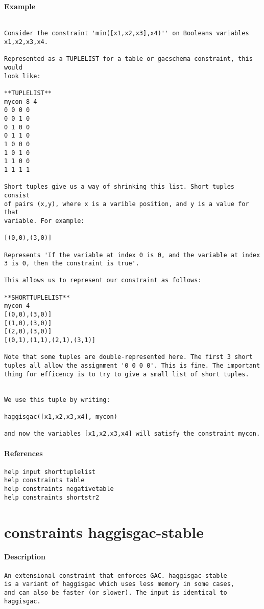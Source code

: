 \paragraph{Example}
{\footnotesize
\begin{verbatim}

Consider the constraint 'min([x1,x2,x3],x4)'' on Booleans variables
x1,x2,x3,x4.

Represented as a TUPLELIST for a table or gacschema constraint, this would
look like:

**TUPLELIST**
mycon 8 4
0 0 0 0
0 0 1 0
0 1 0 0
0 1 1 0
1 0 0 0
1 0 1 0
1 1 0 0
1 1 1 1

Short tuples give us a way of shrinking this list. Short tuples consist
of pairs (x,y), where x is a varible position, and y is a value for that
variable. For example:

[(0,0),(3,0)]

Represents 'If the variable at index 0 is 0, and the variable at index
3 is 0, then the constraint is true'.

This allows us to represent our constraint as follows:

**SHORTTUPLELIST**
mycon 4
[(0,0),(3,0)]
[(1,0),(3,0)]
[(2,0),(3,0)]
[(0,1),(1,1),(2,1),(3,1)]

Note that some tuples are double-represented here. The first 3 short
tuples all allow the assignment '0 0 0 0'. This is fine. The important
thing for efficency is to try to give a small list of short tuples.


We use this tuple by writing:

haggisgac([x1,x2,x3,x4], mycon)

and now the variables [x1,x2,x3,x4] will satisfy the constraint mycon.
\end{verbatim}
}
\paragraph{References}
{\footnotesize
\begin{verbatim}
help input shorttuplelist
help constraints table
help constraints negativetable
help constraints shortstr2
\end{verbatim}
}
\section{constraints haggisgac-stable}
\paragraph{Description}
{\footnotesize
\begin{verbatim}
An extensional constraint that enforces GAC. haggisgac-stable
is a variant of haggisgac which uses less memory in some cases,
and can also be faster (or slower). The input is identical to
haggisgac.
\end{verbatim}
}
